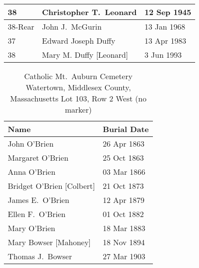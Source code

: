 \begin{table}[ht]
\begin{tabular}{|l|l|l|}
		38 & Christopher T.\ Leonard\index{Leonard!Christopher T.} & 12 Sep 1945 \\ \hline
		38-Rear & John J.\ McGurin\index{McGurin!John Joseph} & 13 Jan 1968 \\ \hline
		37 & Edward Joseph Duffy\index{Duffy!Edward J.} & 13 Apr 1983 \\ \hline
		38 & Mary M. Duffy [Leonard]\index{Leonard!Mary Margaret\textsuperscript{5}}\index{Duffy!Mary Margaret\textsuperscript{5} (Leonard)} & 3 Jun 1993 \\ \hline
	\end{tabular}
\end{table}

\begin{table}[ht]
	\centering
	\caption{Catholic Mt.\ Auburn Cemetery\cite{BillMcEvoy:5} \\
		Watertown, Middlesex County, Massachusetts
		Lot 103, Row 2 West (no marker)}
	\begin{tabular}{|l|l|}
		\hline
		\textbf{Name} & \textbf{Burial Date} \\
		\hline
		John O'Brien\index{O'Brien!John\textsuperscript{2}} & 26 Apr 1863 \\
		\hline
		Margaret O'Brien\index{O'Brien!Margaret\textsuperscript{3} (1862--1863)} & 25 Oct 1863 \\
		\hline
		Anna O'Brien\index{O'Brien!Anna\textsuperscript{3}} & 03 Mar 1866 \\
		\hline
		Bridget O'Brien [Colbert]\index{Colbert!Bridget}\index{O'Brien!Bridget (Colbert)} & 21 Oct 1873 \\
		\hline
		James E.\ O'Brien\index{O'Brien!James Edward\textsuperscript{3}} & 12 Apr 1879 \\
		\hline
		Ellen F.\ O'Brien\index{O'Brien!Ellen/Nellie\textsuperscript{3} (1859--1882)} & 01 Oct 1882 \\
		\hline
		Mary O'Brien\index{O'Brien!Mary\textsuperscript{3} (1856--1883)} & 18 Mar 1883 \\
		\hline
		Mary Bowser [Mahoney]\index{Mahoney/Mahony!Mary}\index{O'Brien!Mary (Mahoney)}\index{Bowser!Mary (Mahoney) (O'Brien)} & 18 Nov 1894 \\
		\hline
		Thomas J.\ Bowser\index{Bowser!Thomas} & 27 Mar 1903 \\
		\hline
	\end{tabular}
\end{table}

